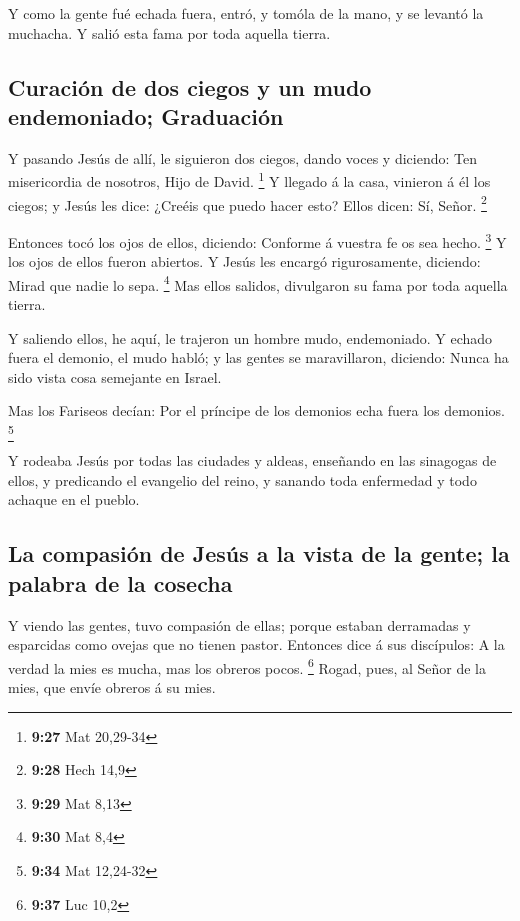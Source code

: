  Y como la gente fué echada fuera, entró, y tomóla de la
mano, y se levantó la muchacha.  Y salió esta fama por toda
aquella tierra.

\hypertarget{curaciuxf3n-de-dos-ciegos-y-un-mudo-endemoniado-graduaciuxf3n}{%
\subsection{Curación de dos ciegos y un mudo endemoniado;
Graduación}\label{curaciuxf3n-de-dos-ciegos-y-un-mudo-endemoniado-graduaciuxf3n}}

 Y pasando Jesús de allí, le siguieron dos ciegos, dando
voces y diciendo: Ten misericordia de nosotros, Hijo de David.
\footnote{\textbf{9:27} Mat 20,29-34}  Y llegado á la casa,
vinieron á él los ciegos; y Jesús les dice: ¿Creéis que puedo hacer
esto? Ellos dicen: Sí, Señor. \footnote{\textbf{9:28} Hech 14,9}

 Entonces tocó los ojos de ellos, diciendo: Conforme á
vuestra fe os sea hecho. \footnote{\textbf{9:29} Mat 8,13} 
Y los ojos de ellos fueron abiertos. Y Jesús les encargó rigurosamente,
diciendo: Mirad que nadie lo sepa. \footnote{\textbf{9:30} Mat 8,4}
 Mas ellos salidos, divulgaron su fama por toda aquella
tierra.

 Y saliendo ellos, he aquí, le trajeron un hombre mudo,
endemoniado.  Y echado fuera el demonio, el mudo habló; y
las gentes se maravillaron, diciendo: Nunca ha sido vista cosa semejante
en Israel.

 Mas los Fariseos decían: Por el príncipe de los demonios
echa fuera los demonios. \footnote{\textbf{9:34} Mat 12,24-32}

 Y rodeaba Jesús por todas las ciudades y aldeas, enseñando
en las sinagogas de ellos, y predicando el evangelio del reino, y
sanando toda enfermedad y todo achaque en el pueblo.

\hypertarget{la-compasiuxf3n-de-jesuxfas-a-la-vista-de-la-gente-la-palabra-de-la-cosecha}{%
\subsection{La compasión de Jesús a la vista de la gente; la palabra de
la
cosecha}\label{la-compasiuxf3n-de-jesuxfas-a-la-vista-de-la-gente-la-palabra-de-la-cosecha}}

 Y viendo las gentes, tuvo compasión de ellas; porque
estaban derramadas y esparcidas como ovejas que no tienen pastor.
 Entonces dice á sus discípulos: A la verdad la mies es
mucha, mas los obreros pocos. \footnote{\textbf{9:37} Luc 10,2}
 Rogad, pues, al Señor de la mies, que envíe obreros á su
mies.

